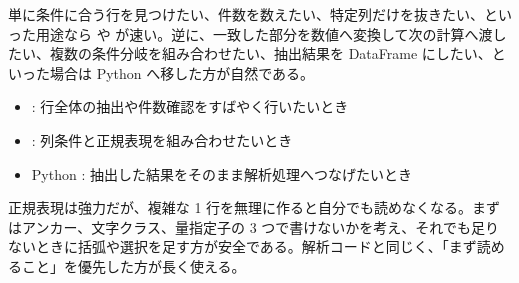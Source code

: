 単に条件に合う行を見つけたい、件数を数えたい、特定列だけを抜きたい、といった用途なら  や  が速い。逆に、一致した部分を数値へ変換して次の計算へ渡したい、複数の条件分岐を組み合わせたい、抽出結果を DataFrame にしたい、といった場合は Python へ移した方が自然である。

\begin{itemize}
\item {}: 行全体の抽出や件数確認をすばやく行いたいとき
\item {}: 列条件と正規表現を組み合わせたいとき
\item Python : 抽出した結果をそのまま解析処理へつなげたいとき
\end{itemize}

正規表現は強力だが、複雑な 1 行を無理に作ると自分でも読めなくなる。まずはアンカー、文字クラス、量指定子の 3 つで書けないかを考え、それでも足りないときに括弧や選択を足す方が安全である。解析コードと同じく、「まず読めること」を優先した方が長く使える。
